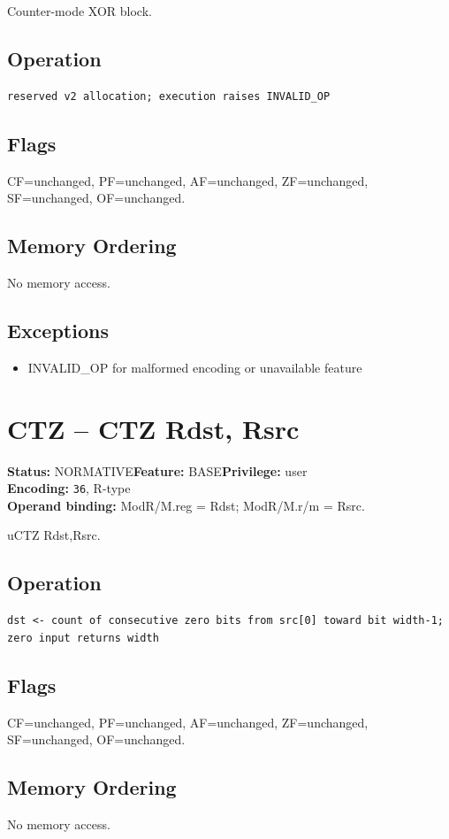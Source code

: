 \documentclass[10pt]{article}
\begin{document}
Counter-mode XOR block.

\subsection*{Operation}
\begin{lstlisting}
reserved v2 allocation; execution raises INVALID_OP
\end{lstlisting}
\subsection*{Flags}
CF=unchanged, PF=unchanged, AF=unchanged, ZF=unchanged, SF=unchanged, OF=unchanged.
\subsection*{Memory Ordering}
No memory access.
\subsection*{Exceptions}
\begin{itemize}
\item INVALID\_OP for malformed encoding or unavailable feature
\end{itemize}
\clearpage

\section{CTZ -- CTZ Rdst, Rsrc}
\textbf{Status:} NORMATIVE\quad \textbf{Feature:} BASE\quad \textbf{Privilege:} user\\
\textbf{Encoding:} \texttt{36}, R-type\\
\textbf{Operand binding:} ModR/M.reg = Rdst; ModR/M.r/m = Rsrc.

uCTZ Rdst,Rsrc.

\subsection*{Operation}
\begin{lstlisting}
dst <- count of consecutive zero bits from src[0] toward bit width-1; zero input returns width
\end{lstlisting}
\subsection*{Flags}
CF=unchanged, PF=unchanged, AF=unchanged, ZF=unchanged, SF=unchanged, OF=unchanged.
\subsection*{Memory Ordering}
No memory access.
\end{document}
